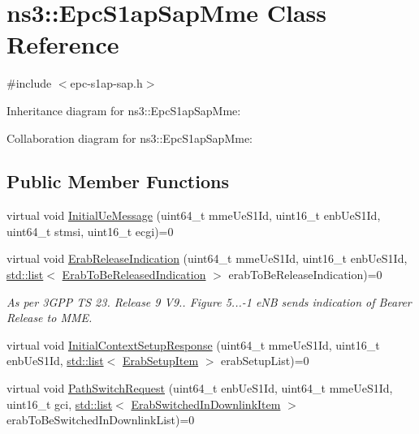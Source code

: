 \hypertarget{classns3_1_1EpcS1apSapMme}{}\section{ns3\+:\+:Epc\+S1ap\+Sap\+Mme Class Reference}
\label{classns3_1_1EpcS1apSapMme}


{\ttfamily \#include $<$epc-\/s1ap-\/sap.\+h$>$}



Inheritance diagram for ns3\+:\+:Epc\+S1ap\+Sap\+Mme\+:


Collaboration diagram for ns3\+:\+:Epc\+S1ap\+Sap\+Mme\+:
\subsection*{Public Member Functions}
\begin{DoxyCompactItemize}
\item 
virtual void \hyperlink{classns3_1_1EpcS1apSapMme_ab83587be82f0b614df9addbe261f8052}{Initial\+Ue\+Message} (uint64\+\_\+t mme\+Ue\+S1\+Id, uint16\+\_\+t enb\+Ue\+S1\+Id, uint64\+\_\+t stmsi, uint16\+\_\+t ecgi)=0
\item 
virtual void \hyperlink{classns3_1_1EpcS1apSapMme_abbcf85dc6001250db97ab398fece85b5}{Erab\+Release\+Indication} (uint64\+\_\+t mme\+Ue\+S1\+Id, uint16\+\_\+t enb\+Ue\+S1\+Id, \hyperlink{openflow-interface_8h_afd9bcfa176617760671b67580f536fa7}{std\+::list}$<$ \hyperlink{structns3_1_1EpcS1apSap_1_1ErabToBeReleasedIndication}{Erab\+To\+Be\+Released\+Indication} $>$ erab\+To\+Be\+Release\+Indication)=0
\begin{DoxyCompactList}\small\item\em As per 3\+G\+PP TS 23. Release 9 V9.. Figure 5...-\/1 e\+NB sends indication of Bearer Release to M\+ME. \end{DoxyCompactList}\item 
virtual void \hyperlink{classns3_1_1EpcS1apSapMme_ab5c90ac197c9248aa47872dfeba235d3}{Initial\+Context\+Setup\+Response} (uint64\+\_\+t mme\+Ue\+S1\+Id, uint16\+\_\+t enb\+Ue\+S1\+Id, \hyperlink{openflow-interface_8h_afd9bcfa176617760671b67580f536fa7}{std\+::list}$<$ \hyperlink{structns3_1_1EpcS1apSap_1_1ErabSetupItem}{Erab\+Setup\+Item} $>$ erab\+Setup\+List)=0
\item 
virtual void \hyperlink{classns3_1_1EpcS1apSapMme_ac82413022edee64f336cf3804ad6184d}{Path\+Switch\+Request} (uint64\+\_\+t enb\+Ue\+S1\+Id, uint64\+\_\+t mme\+Ue\+S1\+Id, uint16\+\_\+t gci, \hyperlink{openflow-interface_8h_afd9bcfa176617760671b67580f536fa7}{std\+::list}$<$ \hyperlink{structns3_1_1EpcS1apSap_1_1ErabSwitchedInDownlinkItem}{Erab\+Switched\+In\+Downlink\+Item} $>$ erab\+To\+Be\+Switched\+In\+Downlink\+List)=0
\end{DoxyCompactItemize}


